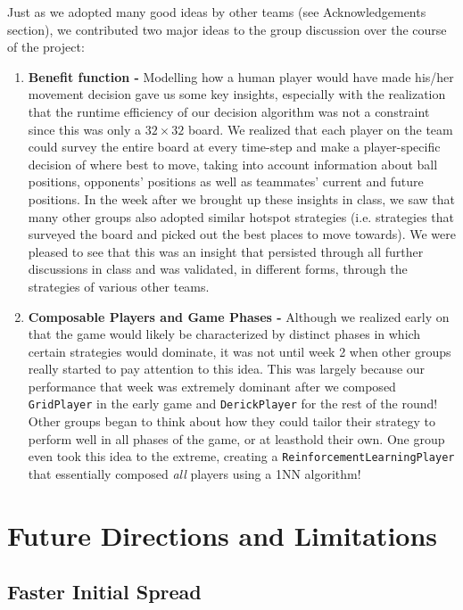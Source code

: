 \documentclass[
10pt, %
letterpaper, %
oneside, %
headinclude,footinclude, %
english
]{article}
\begin{document}
Just as we adopted many good ideas by other teams (see Acknowledgements section), we contributed two major ideas to the group discussion over the course of the project:

\begin{enumerate}
  \item \textbf{Benefit function - } Modelling how a human player would have made his/her movement decision gave us some key insights, especially with the realization that the runtime efficiency of our decision algorithm was not a constraint since this was only a $32 \times 32$ board. We realized that each player on the team could survey the entire board at every time-step and make a player-specific decision of where best to move, taking into account information about ball positions, opponents' positions as well as teammates' current and future positions. In the week after we brought up these insights in class, we saw that many other groups also adopted similar hotspot strategies (i.e. strategies that surveyed the board and picked out the best places to move towards). We were pleased to see that this was an insight that persisted through all further discussions in class and was validated, in different forms, through the strategies of various other teams.
  \item \textbf{Composable Players and Game Phases - } Although we realized early on that the game would likely be characterized by distinct phases in which certain strategies would dominate, it was not until week 2 when other groups really started to pay attention to this idea. This was largely because our performance that week was extremely dominant after we composed \texttt{GridPlayer} in the early game and \texttt{DerickPlayer} for the rest of the round! Other groups began to think about how they could tailor their strategy to perform well in all phases of the game, or at leasthold their own. One group even took this idea to the extreme, creating a \texttt{ReinforcementLearningPlayer} that essentially composed \textit{all} players using a 1NN algorithm!
\end{enumerate}

\section{Future Directions and Limitations}

\subsection{Faster Initial Spread}
\end{document}
